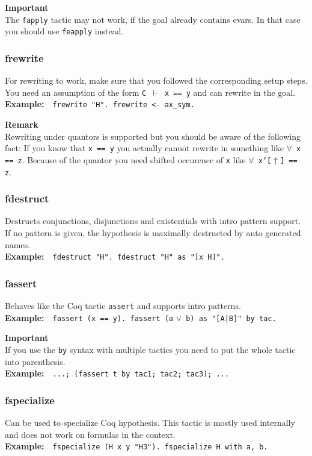 \documentclass[12pt, a4paper]{article}
\newcommand{\coq}[1]{\texttt{#1}}
\newcommand{\important}[1]{
	\vspace{3pt}
	\begin{boximportant}
		\textcolor{colorimportant}{\textbf{Important}\\#1}
	\end{boximportant}}
\newcommand{\remark}[1]{
	\vspace{3pt}
	\begin{boxremark}
		\textbf{Remark}\\#1
	\end{boxremark}}
\newcommand{\example}[1]{\medskip\\\textbf{Example:}~~#1}
\begin{document}
\important{The \texttt{fapply} tactic may not work, if the goal already contains evars. In that case you should use \texttt{feapply} instead.}



\subsubsection{\ttfamily frewrite}

For rewriting to work, make sure that you followed the corresponding setup steps.
You need an assumption of the form \texttt{C $\vdash$ x == y} and can rewrite in the goal.
\example{\coq{frewrite "H". frewrite <- ax_sym.}}

\remark{Rewriting under quantors is supported but you should be aware of the following fact: If you know that \coq{x == y} you actually cannot rewrite in something like \texttt{$\forall$~\coq{x == z}}. Because of the quantor you need shifted occurence of \coq{x} like \texttt{$\forall$~\coq{x`[}$\uparrow$\coq{] == z}}.}


\subsubsection{\ttfamily fdestruct}

Destructs conjunctions, disjunctions and existentials with intro pattern support. 
If no pattern is given, the hypothesis is maximally destructed by auto generated names.
\example{\coq{fdestruct "H". fdestruct "H" as "[x H]".}}


\subsubsection{\ttfamily fassert}

Behaves like the Coq tactic \texttt{assert} and supports intro patterns.
\example{\coq{fassert (x == y). fassert (a} $\lor$\coq{ b) as "[A|B]" by tac.}}

\important{If you use the \coq{by} syntax with multiple tactics you need to put the whole tactic into parenthesis. \example{\texttt{...; (fassert t by tac1; tac2; tac3); ...}}}


\subsubsection{\ttfamily fspecialize}

Can be used to specialize Coq hypothesis.
This tactic is mostly used internally and does not work on formulas in the context.
\example{\coq{fspecialize (H x y "H3"). fspecialize H with a, b.}}
\end{document}
